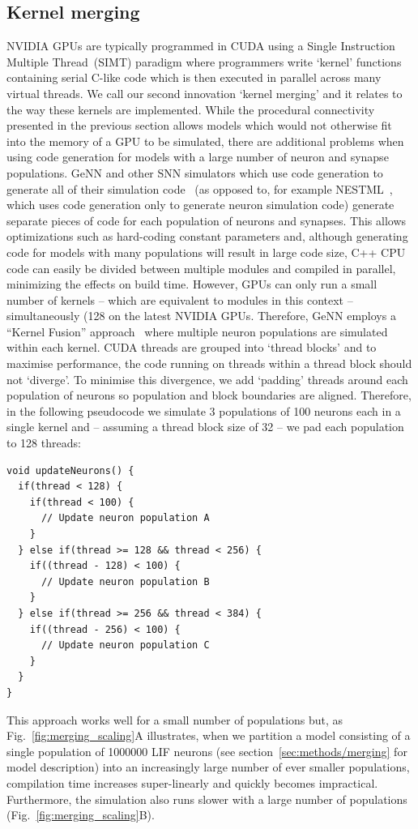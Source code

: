 \documentclass[9pt,a4paper]{amsart}
\begin{document}
\subsection{Kernel merging}
\label{sec:results/kernel_merging}
NVIDIA GPUs are typically programmed in CUDA using a Single Instruction Multiple Thread~(SIMT) paradigm where programmers write `kernel' functions containing serial C-like code which is then executed in parallel across many virtual threads.
We call our second innovation `kernel merging' and it relates to the way these kernels are implemented.
While the procedural connectivity presented in the previous section allows models which would not otherwise fit into the memory of a GPU to be simulated, there are additional problems when using code generation for models with a large number of neuron and synapse populations.
GeNN and other SNN simulators which use code generation to generate all of their simulation code~\citep{Blundell2018} (as opposed to, for example NESTML~\citep{Plotnikov2016}, which uses code generation only to generate neuron simulation code) generate separate pieces of code for each population of neurons and synapses.
This allows optimizations such as hard-coding constant parameters and, although generating code for models with many populations will result in large code size, C++ CPU code can easily be divided between multiple modules and compiled in parallel, minimizing the effects on build time.
However, GPUs can only run a small number of kernels -- which are equivalent to modules in this context --  simultaneously (128 on the latest NVIDIA GPUs.
Therefore, GeNN employs a ``Kernel Fusion'' approach~\citep{Wang2010} where multiple neuron populations are simulated within each kernel.
CUDA threads are grouped into `thread blocks' and to maximise performance, the code running on  threads within a thread block should not `diverge'.
To minimise this divergence, we add `padding' threads around each population of neurons so population and block boundaries are aligned.
Therefore, in the following pseudocode we simulate 3 populations of 100 neurons each in a single kernel and -- assuming a thread block size of 32 -- we pad each population to 128 threads:
%
\begin{lstlisting}
void updateNeurons() {
  if(thread < 128) {
    if(thread < 100) {
      // Update neuron population A
    }
  } else if(thread >= 128 && thread < 256) {
    if((thread - 128) < 100) {
      // Update neuron population B
    }
  } else if(thread >= 256 && thread < 384) {
    if((thread - 256) < 100) {
      // Update neuron population C
    }
  }
}
\end{lstlisting}
%
This approach works well for a small number of populations but, as Fig.~\ref{fig:merging_scaling}A illustrates, when we partition a model consisting of a single population of \num{1000000} LIF neurons (see section~\ref{sec:methods/merging} for model description) into an increasingly large number of ever smaller populations, compilation time increases super-linearly and quickly becomes impractical.
Furthermore, the simulation also runs slower with a large number of populations (Fig.~\ref{fig:merging_scaling}B).
\end{document}
